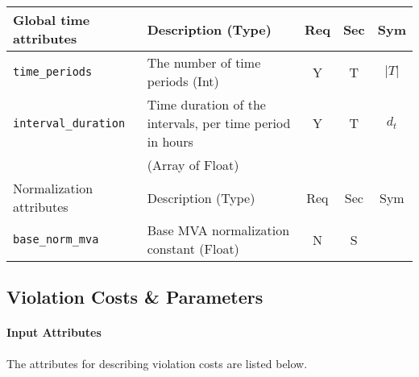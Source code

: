 \documentclass{article}
\begin{document}
\begin{center}
\small
\begin{tabular}{ l | l | c | c | c |}
Global time attributes & Description (Type) & Req & Sec & Sym\\
\hline
  {\tt time\_periods} & The number of time periods (Int) & Y & T & $\lvert T \rvert$ \\
  {\tt interval\_duration} & Time duration of the intervals, per time period in hours & Y & T & $d_t$ \\
                           & (Array of Float) &  &  & \\
\hline
Normalization attributes & Description (Type) & Req & Sec & Sym\\
\hline  
{\tt base\_norm\_mva} & Base MVA normalization constant (Float)  & N & S &  \\
  \hline
\end{tabular}
\end{center}

\subsection{Violation Costs \& Parameters}
\label{nom:violation}
\paragraph{Input Attributes} The attributes for describing violation costs are listed below.
\end{document}
